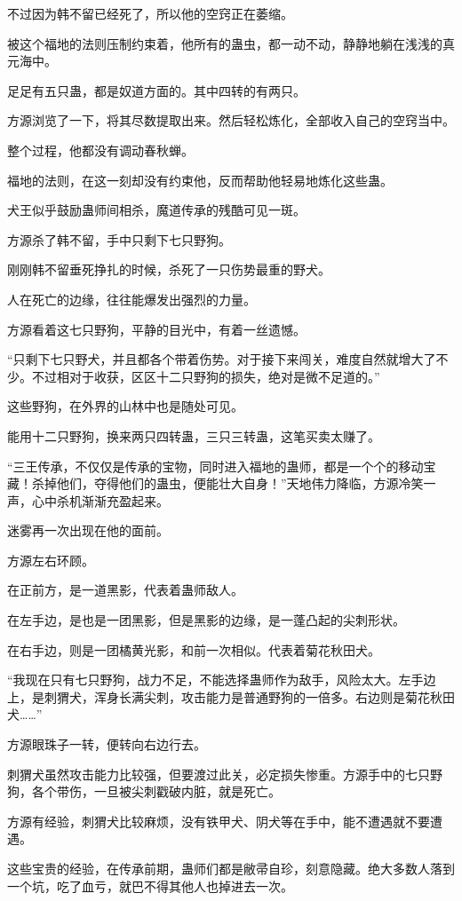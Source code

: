 \begin{this_body}
不过因为韩不留已经死了，所以他的空窍正在萎缩。

被这个福地的法则压制约束着，他所有的蛊虫，都一动不动，静静地躺在浅浅的真元海中。

足足有五只蛊，都是奴道方面的。其中四转的有两只。

方源浏览了一下，将其尽数提取出来。然后轻松炼化，全部收入自己的空窍当中。

整个过程，他都没有调动春秋蝉。

福地的法则，在这一刻却没有约束他，反而帮助他轻易地炼化这些蛊。

犬王似乎鼓励蛊师间相杀，魔道传承的残酷可见一斑。

方源杀了韩不留，手中只剩下七只野狗。

刚刚韩不留垂死挣扎的时候，杀死了一只伤势最重的野犬。

人在死亡的边缘，往往能爆发出强烈的力量。

方源看着这七只野狗，平静的目光中，有着一丝遗憾。

“只剩下七只野犬，并且都各个带着伤势。对于接下来闯关，难度自然就增大了不少。不过相对于收获，区区十二只野狗的损失，绝对是微不足道的。”

这些野狗，在外界的山林中也是随处可见。

能用十二只野狗，换来两只四转蛊，三只三转蛊，这笔买卖太赚了。

“三王传承，不仅仅是传承的宝物，同时进入福地的蛊师，都是一个个的移动宝藏！杀掉他们，夺得他们的蛊虫，便能壮大自身！”天地伟力降临，方源冷笑一声，心中杀机渐渐充盈起来。

迷雾再一次出现在他的面前。

方源左右环顾。

在正前方，是一道黑影，代表着蛊师敌人。

在左手边，是也是一团黑影，但是黑影的边缘，是一蓬凸起的尖刺形状。

在右手边，则是一团橘黄光影，和前一次相似。代表着菊花秋田犬。

“我现在只有七只野狗，战力不足，不能选择蛊师作为敌手，风险太大。左手边上，是刺猬犬，浑身长满尖刺，攻击能力是普通野狗的一倍多。右边则是菊花秋田犬……”

方源眼珠子一转，便转向右边行去。

刺猬犬虽然攻击能力比较强，但要渡过此关，必定损失惨重。方源手中的七只野狗，各个带伤，一旦被尖刺戳破内脏，就是死亡。

方源有经验，刺猬犬比较麻烦，没有铁甲犬、阴犬等在手中，能不遭遇就不要遭遇。

这些宝贵的经验，在传承前期，蛊师们都是敝帚自珍，刻意隐藏。绝大多数人落到一个坑，吃了血亏，就巴不得其他人也掉进去一次。


\end{this_body}
